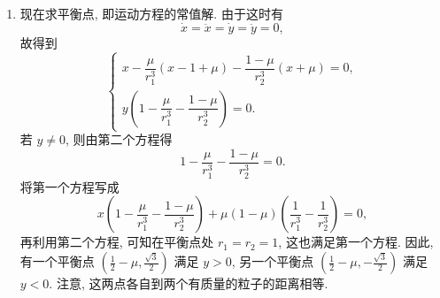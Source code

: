 \begin{description}[font=\normalfont,leftmargin=2em,labelwidth=1.5em]
\begin{enumerate}[label=(\alph*),ref=\alph*,leftmargin=*]
\begin{align*}
  H&=v^x\frac{\partial L}{\partial v^x}+v^y\frac{\partial L}{\partial v^y}-L\\
   &=\frac12((v^x)^2+(v^y)^2)-\frac12(x^2+y^2)-\frac{\mu}{r_1}-\frac{1-\mu}{r_2}.
\end{align*}
\item 现在求平衡点, 即运动方程的常值解. 由于这时有
\[
  \dot x=\ddot x=\dot y=\ddot y=0,
\]
故得到
\[
  \begin{cases}
   x-\dfrac{\mu}{r_1^3}(x-1+\mu)-\dfrac{1-\mu}{r_2^3}(x+\mu)=0,\\[3pt]
   y\left(1-\dfrac{\mu}{r_1^3}-\dfrac{1-\mu}{r_2^3}\right)=0.
  \end{cases}
\]
若 $y\ne0$, 则由第二个方程得
\[
  1-\frac{\mu}{r_1^3}-\frac{1-\mu}{r_2^3}=0.
\]
将第一个方程写成
\[
  x\left(1-\frac{\mu}{r_1^3}-\frac{1-\mu}{r_2^3}\right)
   +\mu(1-\mu)\left(\frac1{r_1^3}-\frac1{r_2^3}\right)=0,
\]
再利用第二个方程, 可知在平衡点处 $r_1=r_2=1$, 这也满足第一个方程. 因此, 有一个平衡点 $(\frac12-\mu,\frac{\sqrt3}{2})$ 满足 $y>0$, 另一个平衡点 $(\frac12-\mu,-\frac{\sqrt3}{2})$ 满足 $y<0$. 注意, 这两点各自到两个有质量的粒子的距离相等.


\end{enumerate}
\end{description}
